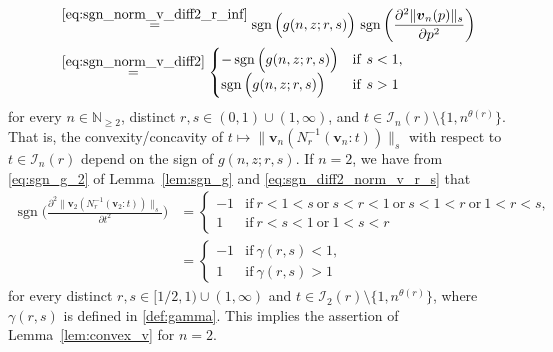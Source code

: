 \documentclass[conference, draftcls, onecolumn]{IEEEtran}
\theoremstyle{plain}
\newcommand{\bvec}[1]{\boldsymbol{#1}}
\newcommand{\sgn}{\operatorname{sgn}}
\newcommand{\lemref}[1]{Lemma~\ref{#1}}
\begin{document}
\begin{IEEEproof}[Proof of \lemref{lem:convex_v}]
\begin{align}
\\
& \qquad \overset{\eqref{eq:sgn_norm_v_diff2_r_inf}}{=}
\sgn\Big( g(n, z; r, s) \Big) \, \sgn\bigg( \frac{ \partial^{2} \| \bvec{v}_{n}( p ) \|_{s} }{ \partial p^{2} } \bigg)
\\
& \qquad \overset{\eqref{eq:sgn_norm_v_diff2}}{=}
\begin{cases}
- \sgn \Big( g(n, z; r, s) \Big)
& \mathrm{if} \ s < 1 ,
\\
\sgn \Big( g(n, z; r, s) \Big)
& \mathrm{if} \ s > 1
\end{cases}
\label{eq:sgn_diff2_norm_v_r_s}
\end{align}
for every $n \in \mathbb{N}_{\ge 2}$, distinct $r, s \in (0, 1) \cup (1, \infty)$, and $t \in \mathcal{I}_{n}( r ) \setminus \{ 1, n^{\theta( r )} \}$.
That is, the convexity/concavity of $t \mapsto \| \bvec{v}_{n}( N_{r}^{-1}( \bvec{v}_{n} : t ) ) \|_{s}$ with respect to $t \in \mathcal{I}_{n}( r )$ depend on the sign of $g(n, z; r, s)$.
If $n = 2$, we have from \eqref{eq:sgn_g_2} of \lemref{lem:sgn_g} and \eqref{eq:sgn_diff2_norm_v_r_s} that
\begin{align}
\sgn \bigg( \frac{ \partial^{2} \| \bvec{v}_{2}( N_{r}^{-1}( \bvec{v}_{2} : t ) ) \|_{s} }{ \partial t^{2} } \bigg)
& =
\begin{cases}
-1
& \mathrm{if} \ r < 1 < s \ \mathrm{or} \ s < r < 1 \ \mathrm{or} \ s < 1 < r \ \mathrm{or} \ 1 < r < s ,
\\
1
& \mathrm{if} \ r < s < 1 \ \mathrm{or} \ 1 < s < r
\end{cases}
\\
& =
\begin{cases}
-1
& \mathrm{if} \ \gamma( r, s ) < 1 ,
\\
1
& \mathrm{if} \ \gamma( r, s ) > 1
\end{cases}
\end{align}
for every distinct $r, s \in [1/2, 1) \cup (1, \infty)$ and $t \in \mathcal{I}_{2}( r ) \setminus \{ 1, n^{\theta( r )} \}$, where $\gamma( r, s )$ is defined in \eqref{def:gamma}.
This implies the assertion of \lemref{lem:convex_v} for $n = 2$.



\end{IEEEproof}
\end{document}
